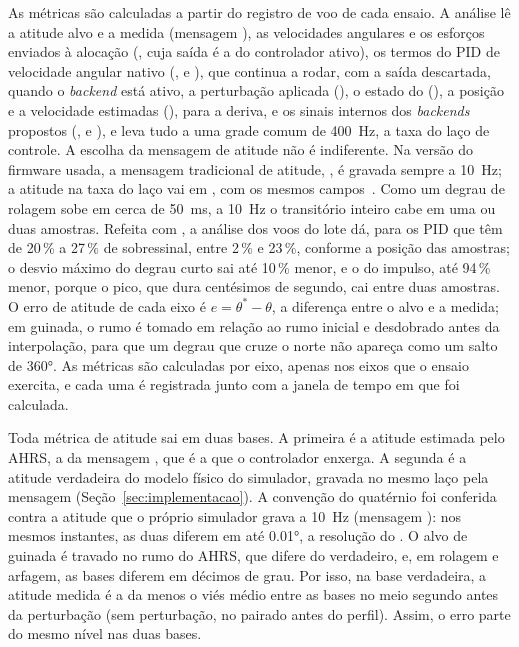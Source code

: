 As métricas são calculadas a partir do registro de voo de cada ensaio. A
análise lê a atitude alvo e a medida (mensagem ), as
velocidades angulares e os esforços enviados à alocação (, cuja
saída é a do controlador ativo), os termos do PID de velocidade angular
nativo (,  e ), que continua a rodar,
com a saída descartada, quando o \textit{backend} está ativo, a perturbação
aplicada (), o estado do 
(), a posição e a velocidade estimadas (), para a
deriva, e os sinais internos dos \textit{backends} propostos
(,  e ), e leva tudo a uma grade comum
de \SI{400}{\hertz}, a taxa do laço de controle. A escolha da mensagem de
atitude não é indiferente. Na versão do firmware usada, a mensagem
tradicional de atitude, , é gravada sempre a \SI{10}{\hertz}; a
atitude na taxa do laço vai em , com os mesmos
campos~\cite{ardupilot2026}. Como um degrau de rolagem sobe em cerca de
\SI{50}{\milli\second}, a \SI{10}{\hertz} o transitório inteiro cabe em uma
ou duas amostras. Refeita com , a análise dos voos do lote dá,
para os PID que têm de 20\,\% a 27\,\% de sobressinal, entre 2\,\% e 23\,\%,
conforme a posição das amostras; o desvio máximo do degrau curto sai até
10\,\% menor, e o do impulso, até 94\,\% menor, porque o pico, que dura
centésimos de segundo, cai entre duas amostras. O erro de
atitude de cada eixo é $e = \theta^* - \theta$, a diferença entre o alvo e a
medida; em guinada, o rumo é tomado em relação ao rumo inicial e desdobrado
antes da interpolação, para que um degrau que cruze o norte não apareça como
um salto de \ang{360}. As métricas são calculadas por eixo, apenas nos eixos
que o ensaio exercita, e cada uma é registrada junto com a janela de tempo em
que foi calculada.

Toda métrica de atitude sai em duas bases. A primeira é a atitude estimada
pelo AHRS, a da mensagem , que é a que o controlador enxerga. A
segunda é a atitude verdadeira do modelo físico do simulador, gravada no
mesmo laço pela mensagem  (Seção~\ref{sec:implementacao}). A
convenção do quatérnio foi conferida contra a atitude que o próprio
simulador grava a \SI{10}{\hertz} (mensagem ): nos mesmos
instantes, as duas diferem em até \ang{0.01}, a resolução do .
O alvo de guinada é travado no rumo do AHRS, que difere do verdadeiro, e,
em rolagem e arfagem, as bases diferem em décimos de grau. Por isso, na base
verdadeira, a atitude medida é a da  menos o viés médio entre as
bases no meio segundo antes da perturbação (sem perturbação, no pairado
antes do perfil). Assim, o erro parte do mesmo nível nas duas bases.


